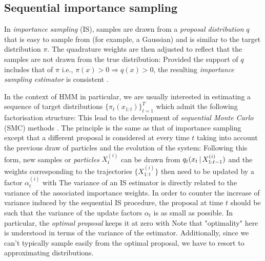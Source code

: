 \subsection{Sequential importance sampling}
In \emph{importance sampling} (IS), samples are drawn from a \emph{proposal distribution} $q$ that is easy to sample from (for example, a Gaussian) and is similar to the target distribution $\pi$. 
The quadrature weights are then adjusted to reflect that the samples are not drawn from the true distribution:
%
%
Provided the support of $q$ includes that of $\pi$ i.e., $\pi(x)>0\Rightarrow q(x)>0$, the resulting \emph{importance sampling estimator} is consistent \citep[chapter 3.3]{robert04}.

In the context of HMM in particular, we are usually interested in estimating a sequence of target distributions $\{\pi_{t}(x_{1:t})\}_{t=1}^{T}$ which admit the following factorisation structure:
%
%
This lead to the development of \emph{sequential Monte Carlo} (SMC) methods \citep[chapter 14.3]{robert04}. The principle is the same as that of importance sampling except that a different proposal is considered at every time $t$ taking into account the previous draw of particles and the evolution of the system:
%
%
Following this form, new samples or \emph{particles} $X^{(i)}_t$ can be drawn from $q_{t}(x_{t}\,|\, X^{(i)}_{1:t-1})$ and the weights corresponding to the trajectories $\{X^{(i)}_{1:t}\}$ then need to be updated by a factor $\alpha^{(i)}_{t}$ with
%
%
The variance of an IS estimator is directly related to the variance of the associated importance weights. In order to counter the increase of variance induced by the sequential IS procedure, the proposal at time $t$ should be such that the variance of the update factors $\alpha_t$ is as small as possible. In particular, the \emph{optimal proposal} \citep{doucet11} keeps it at zero with
Note that "optimality" here is understood in terms of the variance of the estimator. Additionally, since we can't typically sample easily from the optimal proposal, we have to resort to approximating distributions. 

